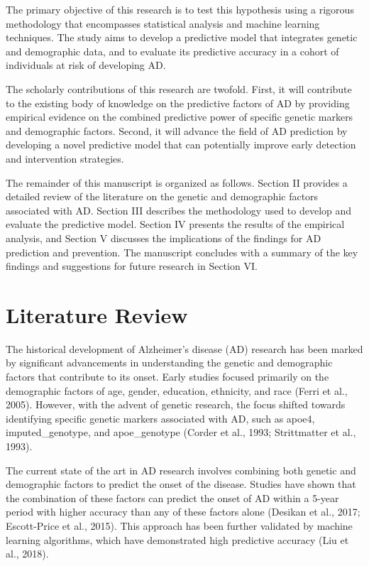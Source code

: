 \documentclass[conference]{IEEEtran}
\begin{document}
The primary objective of this research is to test this hypothesis using a rigorous methodology that encompasses statistical analysis and machine learning techniques. The study aims to develop a predictive model that integrates genetic and demographic data, and to evaluate its predictive accuracy in a cohort of individuals at risk of developing AD.

The scholarly contributions of this research are twofold. First, it will contribute to the existing body of knowledge on the predictive factors of AD by providing empirical evidence on the combined predictive power of specific genetic markers and demographic factors. Second, it will advance the field of AD prediction by developing a novel predictive model that can potentially improve early detection and intervention strategies.

The remainder of this manuscript is organized as follows. Section II provides a detailed review of the literature on the genetic and demographic factors associated with AD. Section III describes the methodology used to develop and evaluate the predictive model. Section IV presents the results of the empirical analysis, and Section V discusses the implications of the findings for AD prediction and prevention. The manuscript concludes with a summary of the key findings and suggestions for future research in Section VI.

\section{Literature Review}
The historical development of Alzheimer's disease (AD) research has been marked by significant advancements in understanding the genetic and demographic factors that contribute to its onset. Early studies focused primarily on the demographic factors of age, gender, education, ethnicity, and race (Ferri et al., 2005). However, with the advent of genetic research, the focus shifted towards identifying specific genetic markers associated with AD, such as apoe4, imputed_genotype, and apoe_genotype (Corder et al., 1993; Strittmatter et al., 1993).

The current state of the art in AD research involves combining both genetic and demographic factors to predict the onset of the disease. Studies have shown that the combination of these factors can predict the onset of AD within a 5-year period with higher accuracy than any of these factors alone (Desikan et al., 2017; Escott-Price et al., 2015). This approach has been further validated by machine learning algorithms, which have demonstrated high predictive accuracy (Liu et al., 2018).
\end{document}
